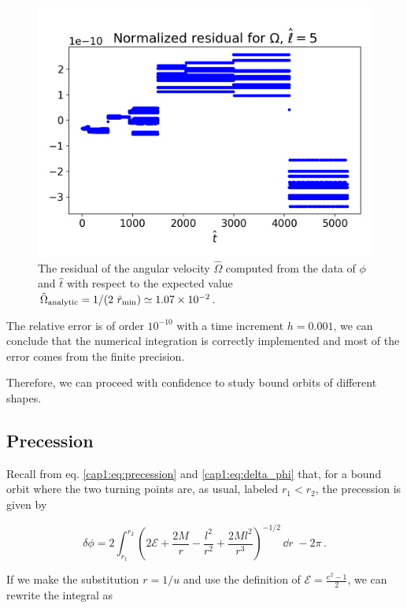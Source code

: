 \begin{figure}[h]
\begin{minipage}{0.48\textwidth}
        \includegraphics[width=1.08\textwidth]{Figures/chapter2/circ_res.png}
        \caption{The residual of the angular velocity $\hat \Omega$ computed
        from the data of $\phi$ and $\hat t$ with respect to the expected value 
        $\hat \Omega_{\rm analytic}
        = 1 / (2 ~ \hat r_{\rm min}) \simeq \num{1.07e-2}$.}
        \label{cap2:fig:circ_orbit_res}
    \end{minipage}
\end{figure}

The relative error is of order $10^{-10}$ with a time increment $h = 0.001$, we
can conclude that the numerical integration is correctly implemented and most
of the error comes from the finite precision.

Therefore, we can proceed with confidence to study bound orbits of different
shapes.


\subsection{Precession}

Recall from eq. \ref{cap1:eq:precession} and \ref{cap1:eq:delta_phi} that, for a
bound orbit where the two turning points are, as usual, labeled $r_1 < r_2$, the
precession is given by

\begin{equation}
    \delta \phi = 2 \int_{r_1}^{r_2} \left( 2 \mathcal E + \frac{2M}{r}
    - \frac{l^2}{r^2} + \frac{2Ml^2}{r^3} \right)^{-1/2} \, \dd{r}
    \; - 2 \pi \, .
\end{equation}

If we make the substitution $r = 1 / u$ and use the definition of $\mathcal E
= \frac{e^2 - 1}{2}$, we can rewrite the integral as

